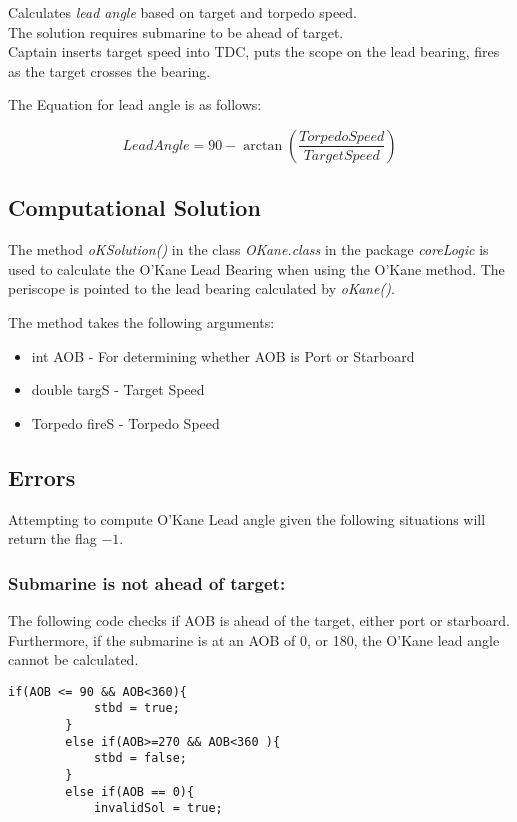 \documentclass{article}
\begin{document}
Calculates \emph{lead angle} based on target and torpedo speed.\\
The solution requires submarine to be ahead of target.\\
Captain inserts target speed into TDC, puts the scope on the lead bearing, fires as the target crosses the bearing.

The Equation for lead angle is as follows:

$$ LeadAngle = 90 - \arctan\left( \frac{Torpedo Speed}{TargetSpeed} \right) $$

\subsection{Computational Solution}
The method \emph{oKSolution()} in the class \emph{OKane.class} in the package \emph{coreLogic} is used to calculate the O'Kane Lead Bearing when using the O'Kane method. The periscope is pointed to the lead bearing calculated by \emph{oKane()}.

The method takes the following arguments:

\begin{itemize}
\item{int AOB - For determining whether AOB is Port or Starboard}
\item{double targS - Target Speed}
\item{Torpedo fireS - Torpedo Speed}
\end{itemize}

\subsection{Errors}

Attempting to compute O'Kane Lead angle given the following situations will return the flag \emph{$-1$}.

\subsubsection{Submarine is not ahead of target:}
The following code checks if AOB is ahead of the target, either port or starboard.
Furthermore, if the submarine is at an AOB of 0, or 180, the O'Kane lead angle cannot be calculated.
\begin{lstlisting}
if(AOB <= 90 && AOB<360){
            stbd = true;
        }
        else if(AOB>=270 && AOB<360 ){
            stbd = false;
        }
        else if(AOB == 0){
            invalidSol = true;
\end{lstlisting}
\end{document}
